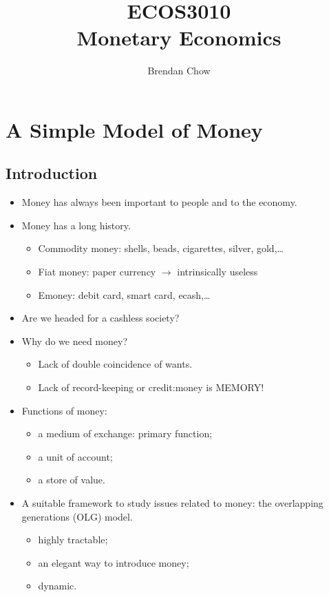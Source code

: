 \documentclass{article}
\numberwithin{equation}{section}
\numberwithin{figure}{section}
\begin{document}
\title{{ECOS3010}\\{\normalsize{Monetary Economics}}}
	\author{Brendan Chow}
	\maketitle
	\newpage
	\pagestyle{fancynotes}
\section{A Simple Model of Money}
\subsection{Introduction}
	\begin{itemize}
		\item Money has always been important to people and to the economy.
		\item Money has a long history.
		\begin{itemize}
			\item Commodity money: shells, beads, cigarettes, silver, gold,\ldots
		\item Fiat money: paper currency \( \rightarrow \) intrinsically useless
		\item Emoney: debit card, smart card, ecash,\ldots
		\end{itemize}
		\item  Are we headed for a cashless society?
		\item Why do we need money?
		\begin{itemize}
			\item Lack of double coincidence of wants.
			\item Lack of record-keeping or credit:\@ money is MEMORY!
		\end{itemize}
		\item Functions of money:
		\begin{itemize}
			\item a medium of exchange: primary function;
			\item a unit of account;
			\item a store of value.
		\end{itemize}
		\item A suitable framework to study issues related to money: the overlapping generations (OLG) model.
		\begin{itemize}
			\item highly tractable;
			\item an elegant way to introduce money;
			\item dynamic.
		\end{itemize}
	\end{itemize}
\end{document}
